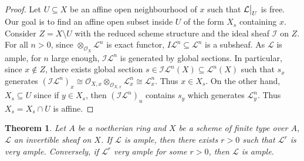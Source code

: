 \documentclass{ctexart}
\newtheorem{theorem}{Theorem}[section]
\begin{document}
\begin{proof}
    Let $U \subseteq X$ be an affine open neighbourhood of $x$ such that $\mathcal{L}\big{|}_{U}$ is free.
    Our goal is to find an affine open subset inside $U$ of the form $X_{s}$ containing $x$.
    Consider $Z = X \setminus U$ with the reduced scheme structure and the ideal sheaf $\mathcal{I}$ on $Z$.
    For all $n > 0$, since $\otimes_{\mathcal{O}_{X}} \mathcal{L}^{n}$ is exact functor, $I\mathcal{L}^{n} \subseteq \mathcal{L}^{n}$ is a subsheaf.
    As $\mathcal{L}$ is ample, for $n$ large enough, $\mathcal{I}\mathcal{L}^{n}$ is generated by global sections.
    In particular, since $x\notin Z$, there exists global section $s\in \mathcal{I}\mathcal{L}^{n}(X) \subseteq \mathcal{L}^{n}(X)$ such that $s_{x}$ generates $(\mathcal{I}\mathcal{L}^{n})_{x} \cong \mathcal{O}_{X, x} \otimes_{\mathcal{O}_{X, x}} \mathcal{L}_{x}^{n} \cong \mathcal{L}_{x}^{n}$.
    Thus $x\in X_{s}$.
    On the other hand, $X_{s} \subseteq U$ since if $y\in X_{s}$, then $(\mathcal{I}\mathcal{L}^{n})_{u}$ contains $s_{y}$ which generates $\mathcal{L}_{y}^{n}$.
    Thus $X_{s} = X_{s} \cap U$ is affine.
\end{proof}
\begin{theorem}
    Let $A$ be a noetherian ring and $X$ be a scheme of finite type over $A$, $\mathcal{L}$ an invertible sheaf on $X$.
    If $\mathcal{L}$ is ample, then there exists $r > 0$ such that $\mathcal{L}^{r}$ is very ample.
    Conversely, if $\mathcal{L}^{r}$ very ample for some $r > 0$, then $\mathcal{L}$ is ample.
    \label{Theorem 4.1}
\end{theorem}
\end{document}
